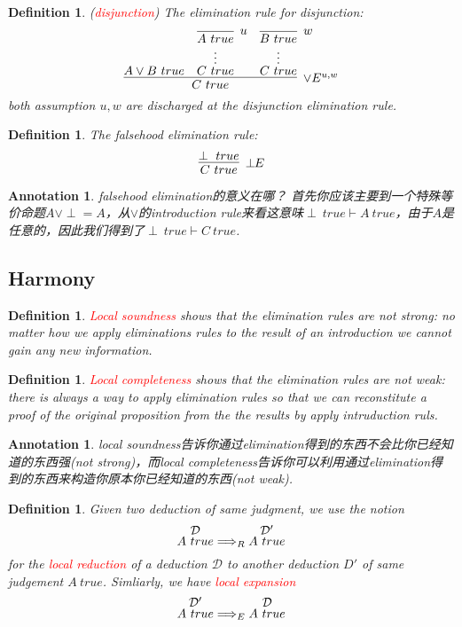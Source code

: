 \documentclass{article}
\theoremstyle{plain}
\newtheorem{definition}[theorem]{Definition}
\newtheorem{annotation}[theorem]{Annotation}
\theoremstyle{nonumberplain}
\newcommand{\redt}[1]{\textcolor{red}{#1}}
\begin{document}
\begin{definition}
\rm (\redt{disjunction}) The elimination rule for disjunction:
$$
\infer[\vee E^{u,w}]{C~true}{A \vee B ~true & \deduce[\vdots]{C~true}{\infer[u]{A~true}{}} & \deduce[\vdots]{C~true}{\infer[w]{B~true}{}}}
$$
both assumption $u,w$ are discharged at the disjunction elimination rule. 
\end{definition}


\begin{definition}
\rm The falsehood elimination rule:
$$
\infer[\perp\!\!E]{C~true}{\perp~true}
$$
\end{definition}

\begin{annotation}
\rm falsehood elimination的意义在哪？ 首先你应该主要到一个特殊等价命题$A \vee \perp = A$，从$\vee$的introduction rule来看这意味$\perp~true \vdash A~true$，由于$A$是任意的，因此我们得到了$\perp~true \vdash C~true$. 
\end{annotation}

\newpage
\subsection{Harmony}

\begin{definition}
\rm \redt{Local soundness} shows that the elimination rules are not strong: no matter how we apply eliminations rules to the result of an introduction we cannot gain any new information.
\end{definition}

\begin{definition}
\rm \redt{Local completeness} shows that the elimination rules are not weak: there is always a way to apply elimination rules so that we can reconstitute a proof of the original proposition from the the results by apply intruduction ruls. 
\end{definition}

\begin{annotation}
\rm local soundness告诉你通过elimination得到的东西不会比你已经知道的东西强(not strong)，而local completeness告诉你可以利用通过elimination得到的东西来构造你原本你已经知道的东西(not weak). 
\end{annotation}


\begin{definition}
\rm Given two deduction of same judgment, we use the notion
$$
\deduce{A~true}{\mathcal{D}} \Longrightarrow_{R} \deduce{A~true}{\mathcal{D'}} 
$$
for the \redt{local reduction} of a deduction $\mathcal{D}$ to another deduction $D'$ of same judgement $A~true$. Simliarly, we have \redt{local expansion}
$$
\deduce{A~true}{\mathcal{D}'} \Longrightarrow_{E} \deduce{A~true}{\mathcal{D}}
$$
\end{definition}
\end{document}
